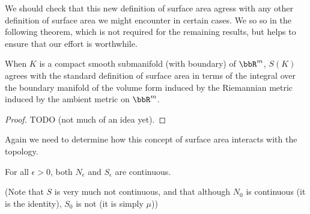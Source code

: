 \documentclass[a4paper,11pt]{article}
\begin{document}
We should check that this new definition of surface area agress with any other
definition of surface area we might encounter in certain cases.  We so so in
the following theorem, which is not required for the remaining results, but
helps to ensure that our effort is worthwhile.

\begin{thm}
\label{thm:smoothSurfaceAreas}
When $K$ is a compact smooth submanifold (with boundary) of $\bbR^m$, $S(K)$
agrees with the standard definition of surface area in terms of the integral
over the boundary manifold of the volume form induced by the Riemannian metric
induced by the ambient metric on $\bbR^m$.
\end{thm}

\begin{proof}
TODO (not much of an idea yet).
\end{proof}

Again we need to determine how this concept of surface area interacts with
the topology.

\begin{lemma}
\label{thm:surfaceAreaContinuous}
For all $\epsilon>0$, both $N_\epsilon$ and $S_\epsilon$ are continuous.
\end{lemma}

(Note that $S$ is very much not continuous, and that although $N_0$ is
continuous (it is the identity), $S_0$ is not (it is simply $\mu$))
\end{document}
